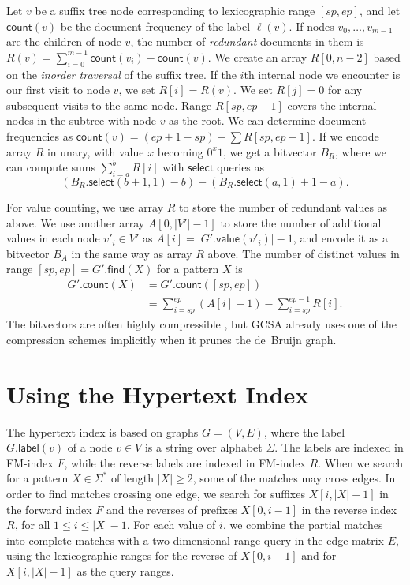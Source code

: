 \documentclass[twoside,leqno,twocolumn]{article}
\newcommand{\abs}[1]{\ensuremath{\lvert #1 \rvert}}
\newcommand{\select}{\ensuremath{\mathsf{select}}}
\newcommand{\find}{\ensuremath{\mathsf{find}}}
\newcommand{\countq}{\ensuremath{\mathsf{count}}}
\newcommand{\glabel}{\ensuremath{\mathsf{label}}}
\newcommand{\gvalue}{\ensuremath{\mathsf{value}}}
\begin{document}
Let $v$ be a suffix tree node corresponding to lexicographic range $[sp, ep]$, and let $\countq(v)$ be the document frequency of the label $\ell(v)$. If nodes $v_{0}, \dotsc, v_{m-1}$ are the children of node $v$, the number of \emph{redundant} documents in them is $R(v) = \sum_{i=0}^{m-1} \countq(v_{i}) - \countq(v)$. We create an array $R[0, n-2]$ based on the \emph{inorder traversal} of the suffix tree. If the $i$th internal node we encounter is our first visit to node $v$, we set $R[i] = R(v)$. We set $R[j] = 0$ for any subsequent visits to the same node. Range $R[sp, ep-1]$ covers the internal nodes in the subtree with node $v$ as the root. We can determine document frequencies as $\countq(v) = (ep+1-sp) - \sum R[sp, ep-1]$. If we encode array $R$ in unary, with value $x$ becoming $0^{x} 1$, we get a bitvector $B_{R}$, where we can compute sums $\sum_{i=a}^{b} R[i]$ with $\select$ queries as
$$
(B_{R}.\select(b+1, 1) - b) - (B_{R}.\select(a, 1) + 1 - a).
$$

For value counting, we use array $R$ to store the number of redundant values as above. We use another array $A[0, \abs{V'}-1]$ to store the number of additional values in each node $v'_{i} \in V'$ as $A[i] = \abs{G'.\gvalue(v'_{i})}-1$, and encode it as a bitvector $B_{A}$ in the same way as array $R$ above. The number of distinct values in range $[sp,ep] = G'.\find(X)$ for a pattern $X$ is
\begin{align*}
G'.\countq(X) & = G'.\countq([sp, ep]) \\
 & = \sum_{i = sp}^{ep} (A[i] + 1) - \sum_{i = sp}^{ep - 1} R[i].
\end{align*}
The bitvectors are often highly compressible \cite{Gagie2015}, but GCSA already uses one of the compression schemes implicitly when it prunes the de~Bruijn graph.


\section{Using the Hypertext Index}\label{appendix:hypertext}

The hypertext index \cite{Thachuk2013} is based on graphs $G = (V, E)$, where the label $G.\glabel(v)$ of a node $v \in V$ is a string over alphabet $\Sigma$. The labels are indexed in FM\nobreakdash-index $F$, while the reverse labels are indexed in FM\nobreakdash-index $R$. When we search for a pattern $X \in \Sigma^{\ast}$ of length $\abs{X} \ge 2$, some of the matches may cross edges. In order to find matches crossing one edge, we search for suffixes $X[i, \abs{X}-1]$ in the forward index $F$ and the reverses of prefixes $X[0, i-1]$ in the reverse index $R$, for all $1 \le i \le \abs{X}-1$. For each value of $i$, we combine the partial matches into complete matches with a two-dimensional range query in the edge matrix $E$, using the lexicographic ranges for the reverse of $X[0, i-1]$ and for $X[i, \abs{X}-1]$ as the query ranges.
\end{document}
